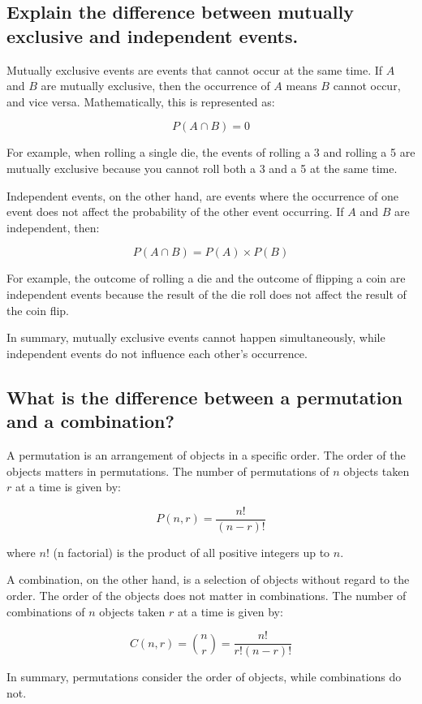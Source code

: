 \documentclass[12pt]{article}
\begin{document}
\subsection{Explain the difference between mutually exclusive and independent events.}
Mutually exclusive events are events that cannot occur at the same time. If \(A\) and \(B\) are mutually exclusive, then the occurrence of \(A\) means \(B\) cannot occur, and vice versa. Mathematically, this is represented as:

\[ P(A \cap B) = 0 \]

For example, when rolling a single die, the events of rolling a 3 and rolling a 5 are mutually exclusive because you cannot roll both a 3 and a 5 at the same time.

Independent events, on the other hand, are events where the occurrence of one event does not affect the probability of the other event occurring. If \(A\) and \(B\) are independent, then:

\[ P(A \cap B) = P(A) \times P(B) \]

For example, the outcome of rolling a die and the outcome of flipping a coin are independent events because the result of the die roll does not affect the result of the coin flip.

In summary, mutually exclusive events cannot happen simultaneously, while independent events do not influence each other's occurrence.

\subsection{What is the difference between a permutation and a combination?}
A permutation is an arrangement of objects in a specific order. The order of the objects matters in permutations. The number of permutations of \(n\) objects taken \(r\) at a time is given by:

\[ P(n, r) = \frac{n!}{(n-r)!} \]

where \(n!\) (n factorial) is the product of all positive integers up to \(n\).

A combination, on the other hand, is a selection of objects without regard to the order. The order of the objects does not matter in combinations. The number of combinations of \(n\) objects taken \(r\) at a time is given by:

\[ C(n, r) = \binom{n}{r} = \frac{n!}{r!(n-r)!} \]

In summary, permutations consider the order of objects, while combinations do not.
\end{document}
